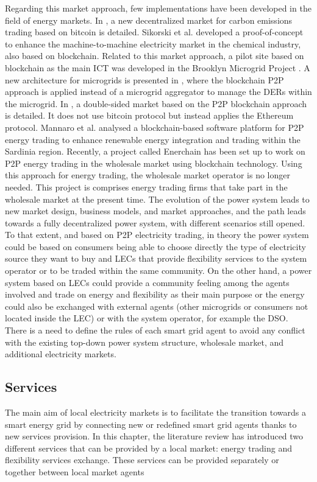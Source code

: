 Regarding this market approach, few implementations have been developed in the field of energy markets. In \cite{al2015bitcoin}, a new decentralized market for carbon emissions trading based on bitcoin is detailed. Sikorski et al. \cite{sikorski2017blockchain} developed a proof-of-concept to enhance the machine-to-machine electricity market in the chemical industry, also based on blockchain. Related to this market approach, a pilot site based on blockchain as the main ICT was developed in the Brooklyn Microgrid Project \cite{mengelkamp2018designing}. A new architecture for microgrids is presented in \cite{munsing2017blockchains}, where the blockchain P2P approach is applied instead of a microgrid aggregator to manage the DERs within the microgrid. In \cite{mengelkamp2018blockchain}, a double-sided market based on the P2P blockchain approach is detailed. It does not use bitcoin protocol but instead applies the Ethereum protocol. Mannaro et al. \cite{mannaro2017crypto} analysed a blockchain-based software platform for P2P energy trading to enhance renewable energy integration and trading within the Sardinia region. Recently, a project called Enerchain \cite{Enerchain} has been set up to work on P2P energy trading in the wholesale market using blockchain technology. Using this approach for energy trading, the wholesale market operator is no longer needed. This project is comprises energy trading firms that take part in the wholesale market at the present time. The evolution of the power system leads to new market design, business models, and market approaches, and the path leads towards a fully decentralized power system, with different scenarios still opened. To that extent, and based on P2P electricity trading, in theory the power system could be based on consumers being able to choose directly the type of electricity source they want to buy and LECs that provide flexibility services to the system operator or to be traded within the same community. On the other hand, a power system based on LECs could provide a community feeling among the agents involved and trade on energy and flexibility as their main purpose or the energy could also be exchanged with external agents (other microgrids or consumers not located inside the LEC) or with the system operator, for example the DSO. There is a need to define the rules of each smart grid agent to avoid any conflict with the existing top-down power system structure, wholesale market, and additional electricity markets.


\subsection{Services} \label{sec:services}
The main aim of local electricity markets is to facilitate the transition towards a smart energy grid by connecting new or redefined smart grid agents thanks to new services provision. In this chapter, the literature review has introduced two different services that can be provided by a local market: energy trading and flexibility services exchange. These services can be provided separately or together between local market agents 

